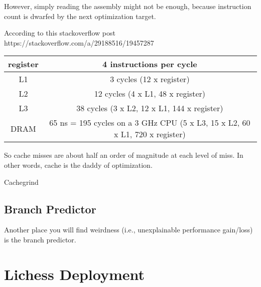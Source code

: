 \documentclass{article}
\begin{document}
However, simply reading the assembly might not be enough, because instruction count is dwarfed by the next optimization target.


According to this stackoverflow post https://stackoverflow.com/a/29188516/19457287

\begin{center}
\begin{tabular}{ |c|c| }
\hline
register & 4 instructions per cycle \\ 
\hline
L1       & 3 cycles (12 x register) \\
\hline
L2       & 12 cycles (4 x L1, 48 x register) \\
\hline
L3       & 38 cycles (3 x L2, 12 x L1, 144 x register) \\
\hline
DRAM     & 65 ns = 195 cycles on a 3 GHz CPU (5 x L3, 15 x L2, 60 x L1, 720 x register) \\
\hline
\end{tabular}
\end{center}


So cache misses are about half an order of magnitude at each level of miss. In other words, cache is the 
daddy of optimization.

Cachegrind

\subsection{Branch Predictor}

Another place you will find weirdness (i.e., unexplainable performance gain/loss) is the branch predictor.

\section{Lichess Deployment}
\end{document}
